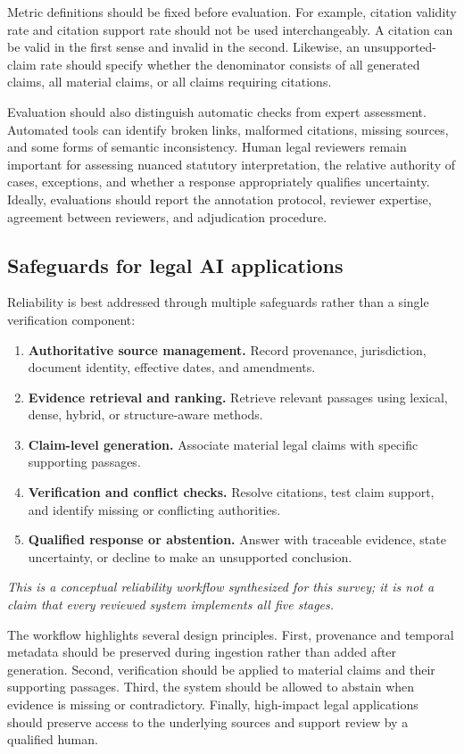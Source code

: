 Metric definitions should be fixed before evaluation. For example, citation validity rate and citation
support rate should not be used interchangeably. A citation can be valid in the first sense and invalid
in the second. Likewise, an unsupported-claim rate should specify whether the denominator consists of
all generated claims, all material claims, or all claims requiring citations.

Evaluation should also distinguish automatic checks from expert assessment. Automated tools can identify
broken links, malformed citations, missing sources, and some forms of semantic inconsistency. Human
legal reviewers remain important for assessing nuanced statutory interpretation, the relative authority
of cases, exceptions, and whether a response appropriately qualifies uncertainty. Ideally, evaluations
should report the annotation protocol, reviewer expertise, agreement between reviewers, and adjudication
procedure.

\subsection{Safeguards for legal AI applications}

Reliability is best addressed through multiple safeguards rather than a single verification component:
\begin{enumerate}[leftmargin=1.4em, itemsep=2pt, topsep=2pt]
\item \textbf{Authoritative source management.} Record provenance, jurisdiction, document identity,
effective dates, and amendments.
\item \textbf{Evidence retrieval and ranking.} Retrieve relevant passages using lexical, dense, hybrid,
or structure-aware methods.
\item \textbf{Claim-level generation.} Associate material legal claims with specific supporting
passages.
\item \textbf{Verification and conflict checks.} Resolve citations, test claim support, and identify
missing or conflicting authorities.
\item \textbf{Qualified response or abstention.} Answer with traceable evidence, state uncertainty, or
decline to make an unsupported conclusion.
\end{enumerate}
\textit{This is a conceptual reliability workflow synthesized for this survey; it is not a claim that
every reviewed system implements all five stages.}

The workflow highlights several design principles. First, provenance and temporal metadata should be
preserved during ingestion rather than added after generation. Second, verification should be applied
to material claims and their supporting passages. Third, the system should be allowed to abstain when
evidence is missing or contradictory. Finally, high-impact legal applications should preserve access to
the underlying sources and support review by a qualified human.

